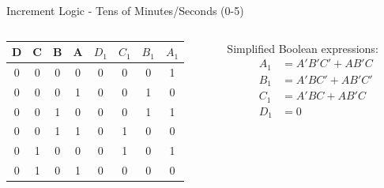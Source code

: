 \documentclass{beamer}
\begin{document}
\begin{frame}{Increment Logic - Tens of Minutes/Seconds (0-5)}
    \begin{columns}
        \begin{column}{0.5\textwidth}
            \begin{table}
                \centering
                \scriptsize
                \begin{tabular}{|c|c|c|c|c|c|c|c|}
                \hline
                D & C & B & A & $D_1$ & $C_1$ & $B_1$ & $A_1$ \\ 
                \hline
                0 & 0 & 0 & 0 & 0 & 0 & 0 & 1 \\
                0 & 0 & 0 & 1 & 0 & 0 & 1 & 0 \\
                0 & 0 & 1 & 0 & 0 & 0 & 1 & 1 \\
                0 & 0 & 1 & 1 & 0 & 1 & 0 & 0 \\
                0 & 1 & 0 & 0 & 0 & 1 & 0 & 1 \\
                0 & 1 & 0 & 1 & 0 & 0 & 0 & 0 \\
                \hline
                \end{tabular}
            \end{table}
        \end{column}
        \begin{column}{0.5\textwidth}
            Simplified Boolean expressions:
            \begin{align*}
                A_1 &= A'B'C' + AB'C \\
                B_1 &= A'BC' + AB'C' \\
                C_1 &= A'BC + AB'C \\
                D_1 &= 0
            \end{align*}
        \end{column}
    \end{columns}
\end{frame}
\end{document}
